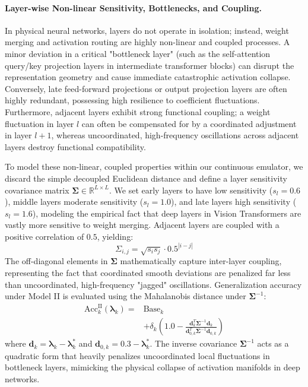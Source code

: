\paragraph{Layer-wise Non-linear Sensitivity, Bottlenecks, and Coupling.}
In physical neural networks, layers do not operate in isolation; instead, weight merging and activation routing are highly non-linear and coupled processes. A minor deviation in a critical "bottleneck layer" (such as the self-attention query/key projection layers in intermediate transformer blocks) can disrupt the representation geometry and cause immediate catastrophic activation collapse. Conversely, late feed-forward projections or output projection layers are often highly redundant, possessing high resilience to coefficient fluctuations. Furthermore, adjacent layers exhibit strong functional coupling; a weight fluctuation in layer $l$ can often be compensated for by a coordinated adjustment in layer $l+1$, whereas uncoordinated, high-frequency oscillations across adjacent layers destroy functional compatibility.

To model these non-linear, coupled properties within our continuous emulator, we discard the simple decoupled Euclidean distance and define a layer sensitivity covariance matrix $\boldsymbol{\Sigma} \in \mathbb{R}^{L \times L}$. We set early layers to have low sensitivity ($s_l = 0.6$), middle layers moderate sensitivity ($s_l = 1.0$), and late layers high sensitivity ($s_l = 1.6$), modeling the empirical fact that deep layers in Vision Transformers are vastly more sensitive to weight merging. Adjacent layers are coupled with a positive correlation of $0.5$, yielding:
\begin{equation}
\Sigma_{i, j} = \sqrt{s_i s_j} \cdot 0.5^{|i-j|}
\end{equation}
The off-diagonal elements in $\boldsymbol{\Sigma}$ mathematically capture inter-layer coupling, representing the fact that coordinated smooth deviations are penalized far less than uncoordinated, high-frequency "jagged" oscillations. Generalization accuracy under Model II is evaluated using the Mahalanobis distance under $\boldsymbol{\Sigma}^{-1}$:
\begin{equation}
\label{eq:model2_accuracy}
\begin{aligned}
\text{Acc}_k^{\text{II}}(\boldsymbol{\lambda}_k) = &\text{Base}_k \\
&+ \delta_k \left( 1.0 - \frac{\mathbf{d}_k^T \boldsymbol{\Sigma}^{-1} \mathbf{d}_k}{\mathbf{d}_{0, k}^T \boldsymbol{\Sigma}^{-1} \mathbf{d}_{0, k}} \right)
\end{aligned}
\end{equation}
where $\mathbf{d}_k = \boldsymbol{\lambda}_k - \boldsymbol{\lambda}^*_k$ and $\mathbf{d}_{0, k} = \mathbf{0.3} - \boldsymbol{\lambda}^*_k$.
The inverse covariance $\boldsymbol{\Sigma}^{-1}$ acts as a quadratic form that heavily penalizes uncoordinated local fluctuations in bottleneck layers, mimicking the physical collapse of activation manifolds in deep networks.

